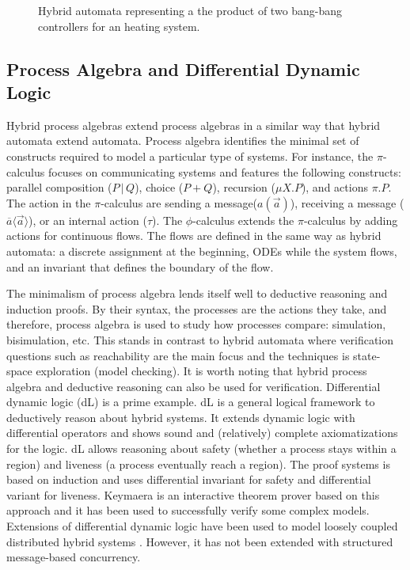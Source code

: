 \documentclass[
graybox,
envcountchap
]{svmult}
\begin{document}
\begin{bibunit}
\begin{figure}
\centering
\resizebox{.8\linewidth}{!}{
    
}
\caption{
    Hybrid automata representing a the product of two bang-bang controllers for an heating system.
}
\label{fig:HA-ex2}
\end{figure}

    \subsection{Process Algebra and Differential Dynamic Logic}

Hybrid process algebras \cite{RoundsS03,BERGSTRA2005215,10.1007/978-3-319-53733-7_8,DBLP:conf/case/CampbellTLPOF16} extend process algebras in a similar way that hybrid automata extend automata.
Process algebra identifies the minimal set of constructs required to model a particular type of systems.
For instance, the $\pi$-calculus \cite{short:MilnerR:calmp1} focuses on communicating systems and features the following constructs:
  parallel composition ($P \,|\, Q$),
  choice ($P + Q$),
  recursion ($\mu X. P$), and
  actions $\pi.P$.
The action in the $\pi$-calculus are
  sending a message($a(\vec a)$),
  receiving a message ($\overline{a}\langle \vec a \rangle$), or
  an internal action ($\tau$). 
The $\phi$-calculus \cite{RoundsS03} extends the $\pi$-calculus by adding actions for continuous flows.
The flows are defined in the same way as hybrid automata:
  a discrete assignment at the beginning,
  ODEs while the system flows, and
  an invariant that defines the boundary of the flow.

The minimalism of process algebra lends itself well to deductive reasoning and induction proofs.
By their syntax, the processes are the actions they take, and therefore, process algebra is used to study how processes compare: simulation, bisimulation, etc.
This stands in contrast to hybrid automata where verification questions such as reachability are the main focus and the techniques is state-space exploration (model checking).
%
It is worth noting that hybrid process algebra and deductive reasoning can also be used for verification.
Differential dynamic logic (dL) \cite{PlatzerBook,Platzer18,PlatzerT18} is a prime example.
dL is a general logical framework to deductively reason about hybrid systems.
It extends dynamic logic with differential operators and shows sound and (relatively) complete axiomatizations for the logic.
dL allows reasoning about safety (whether a process stays within a region) and liveness (a process eventually reach a region).
The proof systems is based on induction and uses differential invariant for safety and differential variant for liveness.
Keymaera \cite{QueselMLAP16} is an interactive theorem prover based on this approach and it has been used to successfully verify some complex models.
Extensions of differential dynamic logic have been used to model loosely coupled distributed hybrid systems \cite{Platzer12}.
However, it has not been extended with structured message-based concurrency.


\end{bibunit}
\end{document}
